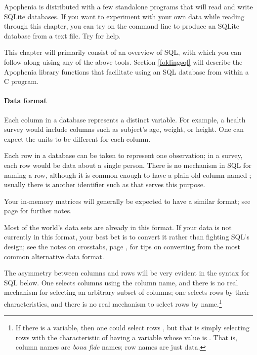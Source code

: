 Apophenia is distributed with a few standalone
programs that will read and write SQLite databases. If you want to
experiment with your own data while reading through this chapter, you can
try  on the command line to produce an SQLite
database from a text file. Try  for help.

This chapter will primarily consist of an overview of SQL, with which you can
follow along uising any of the above tools. Section \ref{foldingsql}
will describe the Apophenia library functions that facilitate using an
SQL database from within a C program.

\paragraph{Data format} Each column in a database represents a distinct
variable. For example, a health survey would include columns such
as subject's age, weight, or height. One can expect the units to be
different for each column.

Each row in a database can be taken to represent one observation; in a
survey, each row would be data about a single person. There is no
mechanism in SQL for naming a row, although it is common enough to
have a plain old column named ; usually there is
another identifier such as  that serves
this purpose.  

Your in-memory matrices will generally be expected to have a similar
format; see page \pageref{dataformats} for further notes.

Most of the world's data sets are already in this format. If your data 
is not currently in this format, your best bet is to convert it rather
than fighting SQL's design; see
the notes on crosstabs, page \pageref{crosstabs}, for tips on
converting from the most common alternative data format.

The asymmetry between columns and rows will be very
evident in the syntax for SQL below. 
One selects columns using the
column name, and there is no real mechanism for selecting an arbitrary
subset of columns; one selects rows by their characteristics, and there
is no real mechanism to select rows by name.\footnote{If there is a
 variable, then one could select rows , but that is simply selecting rows with the
characteristic of having a  variable whose value is
. That is, column names are {\it bona fide} names; row
names are just data.}



